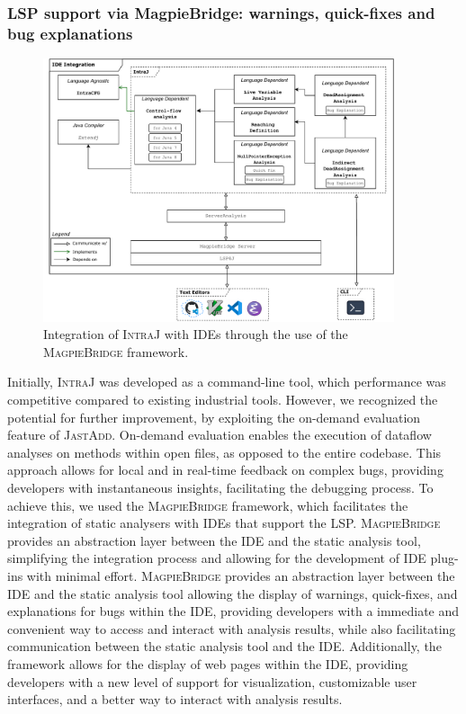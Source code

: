 \subsubsection{LSP support via MagpieBridge: warnings, quick-fixes and bug explanations}
\begin{figure}
  \centering
  \includegraphics[width=0.92\textwidth]{kappa/img/IDEIntegration.pdf}
  \caption{\label{fig:IDEIntegration} Integration of \textsc{IntraJ} with IDEs through the use of the \textsc{MagpieBridge} framework.}
\end{figure}
Initially, \textsc{IntraJ} was developed as a command-line tool, which performance was competitive
compared to existing industrial tools. However, we recognized the potential
for further improvement, by exploiting the on-demand evaluation feature of \textsc{JastAdd}.
On-demand evaluation enables the execution of dataflow analyses
on methods within open files, as opposed to the entire codebase. This approach
allows for local and in real-time feedback on complex bugs, providing developers
with instantaneous insights, facilitating the debugging process.
To achieve this, we used the \textsc{MagpieBridge} framework, which facilitates the integration
of static analysers with IDEs that support the LSP. \textsc{MagpieBridge} provides an
abstraction layer between the IDE and the static analysis tool, simplifying the
integration process and allowing for the development of IDE plug-ins with minimal effort.
\textsc{MagpieBridge} provides an abstraction layer between the IDE and the static
analysis tool allowing the display of warnings, quick-fixes, and explanations
for bugs within the IDE, providing developers with a immediate and convenient way to
access and interact with analysis results, while also facilitating communication
between the static analysis tool and the IDE. Additionally, the framework allows
for the display of web pages within the IDE, providing developers with a new level
of support for visualization, customizable user interfaces, and a better way to
interact with analysis results.

